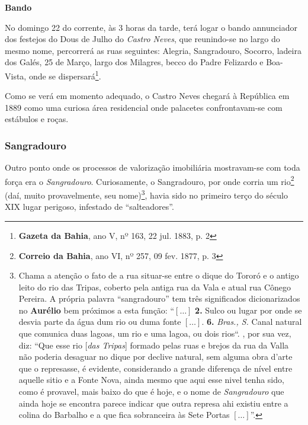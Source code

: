 \begin{citacao}
\textbf{Bando}

No domingo 22 do corrente, às 3 horas da tarde, terá logar o bando annunciador dos festejos do Dous de Julho do \textit{Castro Neves}, que reunindo-se no largo do mesmo nome, percorrerá as ruas seguintes: Alegria, Sangradouro, Socorro, ladeira dos Galés, 25 de Março, largo dos Milagres, becco do Padre Felizardo e Boa-Vista, onde se dispersará\footnote{\textbf{Gazeta da Bahia}, ano V, nº 163, 22 jul. 1883, p. 2}.
\end{citacao}

Como se verá em momento adequado, o Castro Neves chegará à República em 1889 como uma curiosa área residencial onde palacetes confrontavam-se com estábulos e roças.

\subsubsection{Sangradouro}\label{subsubsec:sangradouro}

Outro ponto onde os processos de valorização imobiliária mostravam-se com toda força era o \textit{Sangradouro}. Curiosamente, o Sangradouro, por onde corria um rio\footnote{\textbf{Correio da Bahia}, ano VI, nº 257, 09 fev. 1877, p. 3} (daí, muito provavelmente, seu nome)\footnote{Chama a atenção o fato de a rua situar-se entre o dique do Tororó e o antigo leito do rio das Tripas, coberto pela antiga rua da Vala e atual rua Cônego Pereira. A própria palavra ``sangradouro'' tem três significados dicionarizados no \textbf{Aurélio} bem próximos a esta função: ``\([\dots]\) \textbf{2.} Sulco ou lugar por onde se desvia parte da água dum rio ou duma fonte \([\dots]\). \textbf{6.} \textit{Bras., S.} Canal natural que comunica duas lagoas, um rio e uma lagoa, ou dois rios``. , por sua vez, diz: ``Que esse rio [\textit{das Tripas}] formado pelas ruas e brejos da rua da Valla não poderia desaguar no dique por declive natural, sem alguma obra d'arte que o represasse, é evidente, considerando a grande diferença de nível entre aquelle sitio e a Fonte Nova, ainda mesmo que aqui esse nivel tenha sido, como é provavel, mais baixo do que é hoje, e o nome de \textit{Sangradouro} que ainda hoje se encontra parece indicar que outra represa ahi existiu entre a colina do Barbalho e a que fica sobranceira às Sete Portas \([\dots]\)''.}, havia sido no primeiro terço do século XIX lugar perigoso, infestado de ``salteadores''.

